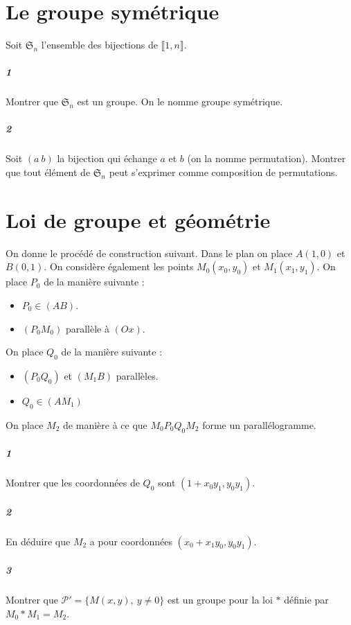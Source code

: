 \documentclass[10pt,a4paper]{article}
\begin{document}
\section{Le groupe symétrique}
Soit $\mathfrak{S}_n$ l'ensemble des bijections de $\llbracket 1,n \rrbracket$.
\subparagraph{1}Montrer que $\mathfrak{S}_n$ est un groupe. On le nomme groupe symétrique.
\subparagraph{2}Soit $(a \ b)$ la bijection qui échange $a$ et $b$ (on la nomme permutation). Montrer que tout élément de $\mathfrak{S}_n$ peut s'exprimer comme composition de permutations.
\section{Loi de groupe et géométrie}
On donne le procédé de construction suivant. Dans le plan on place $A(1,0)$ et $B(0,1)$. On considère également les points $M_0(x_0,y_0)$ et $M_1(x_1,y_1)$. On place $P_0$ de la manière suivante :
\begin{itemize}
\item $P_0 \in (AB)$.
\item $(P_0 M_0)$ parallèle à $(Ox)$. 
\end{itemize}
On place $Q_0$ de la manière suivante :
\begin{itemize}
\item $(P_0 Q_0)$ et $(M_1B)$ parallèles.
\item $Q_0 \in (AM_1)$
\end{itemize}
On place $M_2$ de manière à ce que $M_0P_0Q_0M_2$ forme un parallélogramme.
\subparagraph{1}Montrer que les coordonnées de $Q_0$ sont $(1+x_0y_1,y_0y_1)$.
\subparagraph{2}En déduire que $M_2$ a pour coordonnées $(x_0+x_1y_0,y_0y_1)$.
\subparagraph{3}Montrer que $\mathcal{P}'=\lbrace M(x,y), \ y \neq 0 \rbrace$ est un groupe pour la loi $*$ définie par $M_0*M_1=M_2$.
\end{document}
